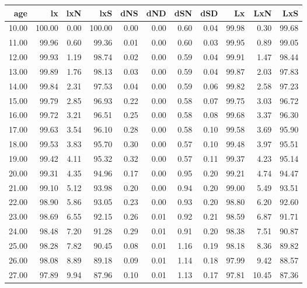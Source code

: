 \begin{table}[ht]
\centering
\begin{tabular}{rrrrrrrrrrr}
  \hline
age & lx & lxN & lxS & dNS & dND & dSN & dSD & Lx & LxN & LxS \\ 
  \hline
10.00 & 100.00 & 0.00 & 100.00 & 0.00 & 0.00 & 0.60 & 0.04 & 99.98 & 0.30 & 99.68 \\ 
  11.00 & 99.96 & 0.60 & 99.36 & 0.01 & 0.00 & 0.60 & 0.03 & 99.95 & 0.89 & 99.05 \\ 
  12.00 & 99.93 & 1.19 & 98.74 & 0.02 & 0.00 & 0.59 & 0.04 & 99.91 & 1.47 & 98.44 \\ 
  13.00 & 99.89 & 1.76 & 98.13 & 0.03 & 0.00 & 0.59 & 0.04 & 99.87 & 2.03 & 97.83 \\ 
  14.00 & 99.84 & 2.31 & 97.53 & 0.04 & 0.00 & 0.59 & 0.06 & 99.82 & 2.58 & 97.23 \\ 
  15.00 & 99.79 & 2.85 & 96.93 & 0.22 & 0.00 & 0.58 & 0.07 & 99.75 & 3.03 & 96.72 \\ 
  16.00 & 99.72 & 3.21 & 96.51 & 0.25 & 0.00 & 0.58 & 0.08 & 99.68 & 3.37 & 96.30 \\ 
  17.00 & 99.63 & 3.54 & 96.10 & 0.28 & 0.00 & 0.58 & 0.10 & 99.58 & 3.69 & 95.90 \\ 
  18.00 & 99.53 & 3.83 & 95.70 & 0.30 & 0.00 & 0.57 & 0.10 & 99.48 & 3.97 & 95.51 \\ 
  19.00 & 99.42 & 4.11 & 95.32 & 0.32 & 0.00 & 0.57 & 0.11 & 99.37 & 4.23 & 95.14 \\ 
  20.00 & 99.31 & 4.35 & 94.96 & 0.17 & 0.00 & 0.95 & 0.20 & 99.21 & 4.74 & 94.47 \\ 
  21.00 & 99.10 & 5.12 & 93.98 & 0.20 & 0.00 & 0.94 & 0.20 & 99.00 & 5.49 & 93.51 \\ 
  22.00 & 98.90 & 5.86 & 93.05 & 0.23 & 0.00 & 0.93 & 0.20 & 98.80 & 6.20 & 92.60 \\ 
  23.00 & 98.69 & 6.55 & 92.15 & 0.26 & 0.01 & 0.92 & 0.21 & 98.59 & 6.87 & 91.71 \\ 
  24.00 & 98.48 & 7.20 & 91.28 & 0.29 & 0.01 & 0.91 & 0.20 & 98.38 & 7.51 & 90.87 \\ 
  25.00 & 98.28 & 7.82 & 90.45 & 0.08 & 0.01 & 1.16 & 0.19 & 98.18 & 8.36 & 89.82 \\ 
  26.00 & 98.08 & 8.89 & 89.18 & 0.09 & 0.01 & 1.14 & 0.18 & 97.99 & 9.42 & 88.57 \\ 
  27.00 & 97.89 & 9.94 & 87.96 & 0.10 & 0.01 & 1.13 & 0.17 & 97.81 & 10.45 & 87.36 \\ 

\end{tabular}
\end{table}
